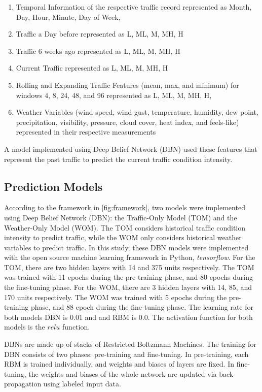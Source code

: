 \begin{enumerate}
\item Temporal Information of the respective traffic record represented as Month, Day, Hour, Minute, Day of Week,
\item Traffic a Day before represented as L, ML, M, MH, H
\item Traffic 6 weeks ago represented as L, ML, M, MH, H
\item Current Traffic represented as L, ML, M, MH, H
\item Rolling and Expanding Traffic Features (mean, max, and minimum) for windows 4, 8, 24, 48, and 96 represented as L, ML, M, MH, H,
\item Weather Variables (wind speed, wind gust, temperature, humidity, dew point, precipitation, visibility, pressure, cloud cover, heat index, and feels-like) represented in their respective measurements
\end{enumerate}

A model implemented using Deep Belief Network (DBN) used these features that represent the past traffic to predict the current traffic condition intensity.

\subsection{Prediction Models}
According to the framework in \ref{fig:framework}, two models were implemented using Deep Belief Network (DBN): the Traffic-Only Model (TOM) and the Weather-Only Model (WOM). The TOM considers historical traffic condition intensity to predict traffic, while the WOM only considers historical weather variables to predict traffic. In this study, these DBN models were implemented with the open source machine learning framework in Python, \textit{tensorflow}. For the TOM, there are two hidden layers with 14 and 375 units respectively. The TOM was trained with 11 epochs during the pre-training phase, and 80 epochs during the fine-tuning phase. For the WOM, there are 3 hidden layers with 14, 85, and 170 units respectively. The WOM was trained with 5 epochs during the pre-training phase, and 88 epoch during the fine-tuning phase. The learning rate for both models DBN is 0.01 and and RBM is 0.0. The activation function for both models is the $relu$ function.

DBNs are made up of stacks of Restricted Boltzmann Machines. The training for DBN consists of two phases: pre-training and fine-tuning. In pre-training, each RBM is trained individually, and weights and biases of layers are fixed. In fine-tuning, the weights and biases of the whole network are updated via back propagation using labeled input data.

